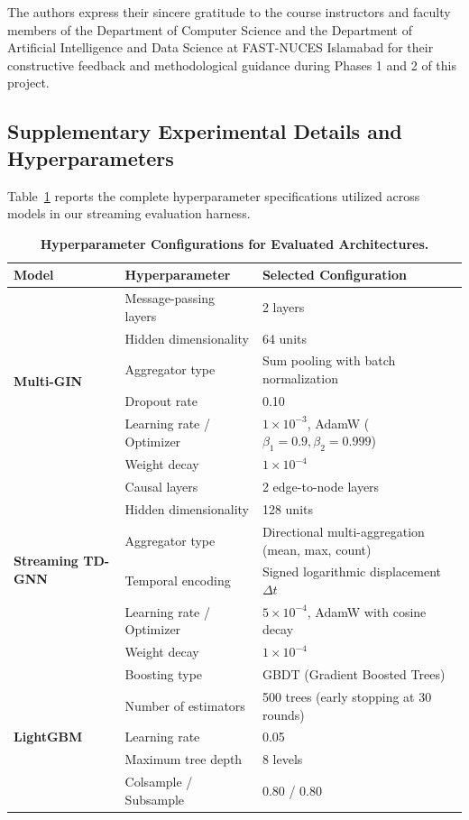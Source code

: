 \documentclass[pdflatex,sn-mathphys,Numbered]{sn-jnl}
\theoremstyle{thmstyleone}
\theoremstyle{thmstyletwo}
\theoremstyle{thmstylethree}
\begin{document}
The authors express their sincere gratitude to the course instructors and faculty members of the Department of Computer Science and the Department of Artificial Intelligence and Data Science at FAST-NUCES Islamabad for their constructive feedback and methodological guidance during Phases 1 and 2 of this project.

\begin{appendices}

\section{Supplementary Experimental Details and Hyperparameters}
\label{sec:appendix_hyperparams}

Table~\ref{tab:hyperparameters} reports the complete hyperparameter specifications utilized across models in our streaming evaluation harness.

\begin{table}[ht]
\centering
\small
\caption{\textbf{Hyperparameter Configurations for Evaluated Architectures.}}
\label{tab:hyperparameters}
\begin{tabular}{llp{4.0cm}}
\toprule
\textbf{Model} & \textbf{Hyperparameter} & \textbf{Selected Configuration} \\
\midrule
\multirow{6}{*}{\textbf{Multi-GIN}} & Message-passing layers & 2 layers \\
 & Hidden dimensionality & 64 units \\
 & Aggregator type & Sum pooling with batch normalization \\
 & Dropout rate & 0.10 \\
 & Learning rate / Optimizer & $1 \times 10^{-3}$, AdamW ($\beta_1=0.9, \beta_2=0.999$) \\
 & Weight decay & $1 \times 10^{-4}$ \\
\midrule
\multirow{6}{*}{\textbf{Streaming TD-GNN}} & Causal layers & 2 edge-to-node layers \\
 & Hidden dimensionality & 128 units \\
 & Aggregator type & Directional multi-aggregation (mean, max, count) \\
 & Temporal encoding & Signed logarithmic displacement $\Delta t$ \\
 & Learning rate / Optimizer & $5 \times 10^{-4}$, AdamW with cosine decay \\
 & Weight decay & $1 \times 10^{-4}$ \\
\midrule
\multirow{5}{*}{\textbf{LightGBM}} & Boosting type & GBDT (Gradient Boosted Trees) \\
 & Number of estimators & 500 trees (early stopping at 30 rounds) \\
 & Learning rate & 0.05 \\
 & Maximum tree depth & 8 levels \\
 & Colsample / Subsample & 0.80 / 0.80 \\
\bottomrule
\end{tabular}
\end{table}


\end{appendices}
\end{document}
